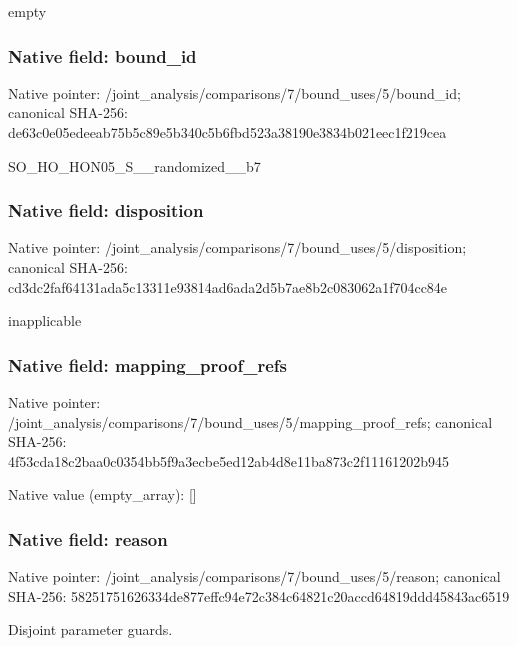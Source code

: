 \documentclass[10pt,a4paper]{article}
\begin{document}
\begingroup\raggedright\sloppy empty\par\endgroup

\subsubsection{Native field: bound\_\allowbreak{}id}
Native pointer: /joint\_\allowbreak{}analysis/comparisons/7/bound\_\allowbreak{}uses/5/bound\_\allowbreak{}id; canonical SHA-256: de63c0e05edeeab75b5c89e5b340c5b6fbd523a38190e3834b021eec1f219cea

\begingroup\raggedright\sloppy SO\_\allowbreak{}HO\_\allowbreak{}HON05\_\allowbreak{}S\_\allowbreak{}\_\allowbreak{}randomized\_\allowbreak{}\_\allowbreak{}b7\par\endgroup

\subsubsection{Native field: disposition}
Native pointer: /joint\_\allowbreak{}analysis/comparisons/7/bound\_\allowbreak{}uses/5/disposition; canonical SHA-256: cd3dc2faf64131ada5c13311e93814ad6ada2d5b7ae8b2c083062a1f704cc84e

\begingroup\raggedright\sloppy inapplicable\par\endgroup

\subsubsection{Native field: mapping\_\allowbreak{}proof\_\allowbreak{}refs}
Native pointer: /joint\_\allowbreak{}analysis/comparisons/7/bound\_\allowbreak{}uses/5/mapping\_\allowbreak{}proof\_\allowbreak{}refs; canonical SHA-256: 4f53cda18c2baa0c0354bb5f9a3ecbe5ed12ab4d8e11ba873c2f11161202b945

Native value (empty\_\allowbreak{}array): []

\subsubsection{Native field: reason}
Native pointer: /joint\_\allowbreak{}analysis/comparisons/7/bound\_\allowbreak{}uses/5/reason; canonical SHA-256: 58251751626334de877effc94e72c384c64821c20accd64819ddd45843ac6519

\begingroup\raggedright\sloppy Disjoint parameter guards.\par\endgroup
\end{document}
